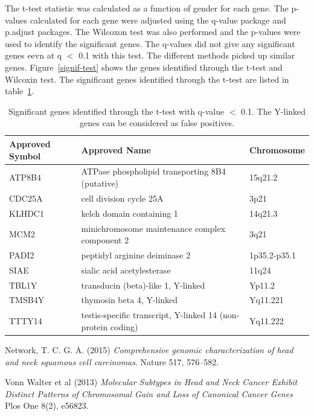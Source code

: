 \documentclass[11pt]{article} %
\begin{document}
The t-test statistic was calculated as a function of gender for each gene. The p-values calculated for each gene were adjusted using the q-value package and p.adjust packages. The Wilcoxon test was also performed and the p-values were used to identify the significant genes. The q-values did not give any significant genes eevn at q $<$ 0.1 with this test. The different methods picked up similar genes. Figure~\ref{signif-test} shows the genes identified through the t-test and Wilcoxin test. The significant genes identified through the t-test are listed in table~\ref{signif2}.

\begin{table}[htb]
\small
   \centering
   \caption{Significant genes identified through the t-test with q-value $<$ 0.1. The Y-linked genes can be considered as false positives.} %
   \begin{tabular}{p{1.5cm} p{10cm} p{2.5cm}} %
   \toprule
Approved Symbol & Approved Name & Chromosome \\
\midrule
ATP8B4 & ATPase phospholipid transporting 8B4 (putative) & 15q21.2 \\
CDC25A & cell division cycle 25A & 3p21 \\
KLHDC1 & kelch domain containing 1 & 14q21.3 \\
MCM2 & minichromosome maintenance complex component 2 & 3q21 \\
PADI2 & peptidyl arginine deiminase 2 & 1p35.2-p35.1 \\
SIAE & sialic acid acetylesterase & 11q24 \\
TBL1Y & transducin (beta)-like 1, Y-linked & Yp11.2 \\
TMSB4Y & thymosin beta 4, Y-linked & Yq11.221 \\
TTTY14 & testis-specific transcript, Y-linked 14 (non-protein coding) & Yq11.222 \\
\bottomrule
   \end{tabular}
   \label{signif2}
\end{table}
\begin{thebibliography}{9}


Network, T. C. G. A. (2015)
\textit{Comprehensive genomic characterization of head and neck squamous cell carcinomas}. 
Nature 517, 576–582.

Vonn Walter et al (2013)
\textit{Molecular Subtypes in Head and Neck Cancer Exhibit
Distinct Patterns of Chromosomal Gain and Loss of
Canonical Cancer Genes}
Plos One 8(2), e56823.

\end{thebibliography}
\end{document}
